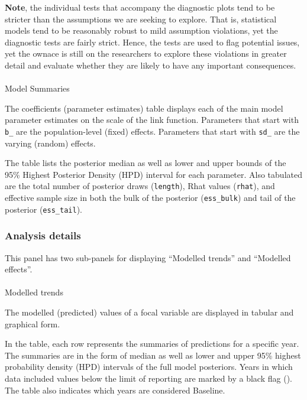 \documentclass[
  8pt,
  a4paper]{article}
\makeatletter
\let\oldparagraph\paragraph
\renewcommand{\paragraph}{
    \@ifstar
      \xxxParagraphStar
      \xxxParagraphNoStar
  }
\newcommand{\xxxParagraphStar}[1]{\oldparagraph*{#1}\mbox{}}
\newcommand{\xxxParagraphNoStar}[1]{\oldparagraph{#1}\mbox{}}
\makeatother
\begin{document}
\textbf{Note}, the individual tests that accompany the diagnostic plots
tend to be stricter than the assumptions we are seeking to explore. That
is, statistical models tend to be reasonably robust to mild assumption
violations, yet the diagnostic tests are fairly strict. Hence, the tests
are used to flag potential issues, yet the ownace is still on the
researchers to explore these violations in greater detail and evaluate
whether they are likely to have any important consequences.

\paragraph{Model Summaries}\label{model-summaries}

The coefficients (parameter estimates) table displays each of the main
model parameter estimates on the scale of the link function. Parameters
that start with \texttt{b\_} are the population-level (fixed) effects.
Parameters that start with \texttt{sd\_} are the varying (random)
effects.

The table lists the posterior median as well as lower and upper bounds
of the 95\% Highest Posterior Density (HPD) interval for each parameter.
Also tabulated are the total number of posterior draws
(\texttt{length}), Rhat values (\texttt{rhat}), and effective sample
size in both the bulk of the posterior (\texttt{ess\_bulk}) and tail of
the posterior (\texttt{ess\_tail}).

\subsubsection{Analysis details}\label{analysis-details}

This panel has two sub-panels for displaying ``Modelled trends'' and
``Modelled effects''.

\paragraph{Modelled trends}\label{modelled-trends}

The modelled (predicted) values of a focal variable are displayed in
tabular and graphical form.

In the table, each row represents the summaries of predictions for a
specific year. The summaries are in the form of median as well as lower
and upper 95\% highest probability density (HPD) intervals of the full
model posteriors. Years in which data included values below the limit of
reporting are marked by a black flag ({}). The table also indicates
which years are considered Baseline.
\end{document}
